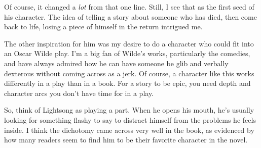 Of course, it changed a \textit{lot} from that one line. Still, I see that as the first seed of his character. The idea of telling a story about someone who has died, then come back to life, losing a piece of himself in the return intrigued me.

The other inspiration for him was my desire to do a character who could fit into an Oscar Wilde play. I’m a big fan of Wilde’s works, particularly the comedies, and have always admired how he can have someone be glib and verbally dexterous without coming across as a jerk. Of course, a character like this works differently in a play than in a book. For a story to be epic, you need depth and character arcs you don’t have time for in a play.

So, think of Lightsong as playing a part. When he opens his mouth, he’s usually looking for something flashy to say to distract himself from the problems he feels inside. I think the dichotomy came across very well in the book, as evidenced by how many readers seem to find him to be their favorite character in the novel.



